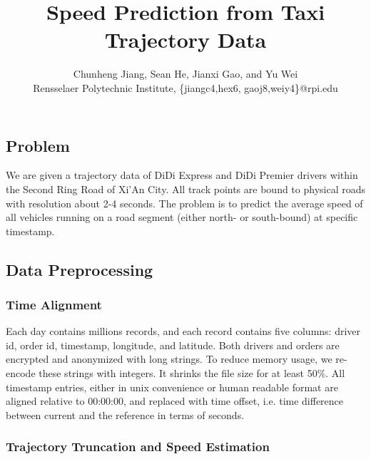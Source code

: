 \documentclass[5pt]{article}
\title{Speed Prediction from Taxi Trajectory Data}
\author{Chunheng Jiang, Sean He, Jianxi Gao, and Yu Wei\\
\small{Rensselaer Polytechnic Institute, \{jiangc4,hex6, gaoj8,weiy4\}@rpi.edu}}
\numberwithin{table}{section}
\newenvironment{affiliations}{
    \setcounter{enumi}{1}
    \setlength{\parindent}{0in}
    \slshape\sloppy
    \begin{list}{\upshape$^{\arabic{enumi}}$}{
        \usecounter{enumi}
        \setlength{\leftmargin}{0in}
        \setlength{\topsep}{0in}
        \setlength{\labelsep}{0in}
        \setlength{\labelwidth}{0in}
        \setlength{\listparindent}{0in}
        \setlength{\itemsep}{0ex}
        \setlength{\parsep}{0in}
        }
    }{\end{list}\par\vspace{12pt}}
\begin{document}
\maketitle
\noindent


\subsection*{Problem}
We are given a trajectory data of DiDi Express and DiDi Premier drivers within the Second Ring Road of Xi'An City. 
All track points are bound to physical roads with resolution about 2-4 seconds. The problem is to predict the average speed of all vehicles running on a road segment (either north- or south-bound) at specific timestamp. 

\subsection*{Data Preprocessing}
\subsubsection*{Time Alignment}
Each day contains millions records, and each record contains five columns: driver id, order id, timestamp, longitude, and latitude. Both drivers and orders are encrypted and anonymized with long strings. To reduce memory usage, we re-encode these strings with integers. It shrinks the file size for at least 50\%. All timestamp entries, either in unix convenience or human readable format are aligned relative to 00:00:00, and replaced with time offset, i.e. time difference between current and the reference in terms of seconds.

\subsubsection*{Trajectory Truncation and Speed Estimation}
\end{document}

